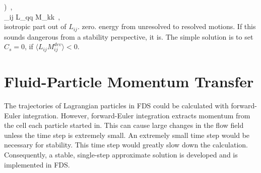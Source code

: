\right) \,\mbox{,} \nonumber \\
\delta_{ij} L_{qq} M_{kk} \,\mbox{,} \nonumber \\
isotropic part out of $L_{ij}$.
zero.
energy from unresolved to resolved motions.  If this sounds dangerous from a stability perspective, it is.  The simple solution is
to set $C_s = 0$, if $\langle L_{ij}M_{ij}^{dev} \rangle < 0$.



\chapter{Fluid-Particle Momentum Transfer}

The trajectories of Lagrangian particles in FDS could be calculated with forward-Euler integration. However, forward-Euler
integration extracts momentum from the cell each particle started in. This can cause large changes in the flow field unless the
time step is extremely small. An extremely small time step would be necessary for stability. This time step would greatly slow
down the calculation. Consequently, a stable, single-step approximate solution is developed and is implemented in FDS.


